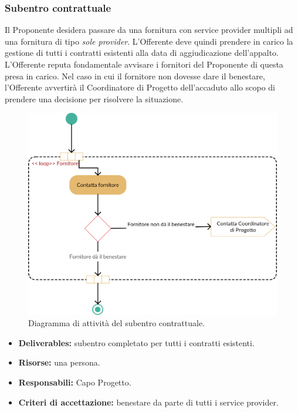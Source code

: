             \subsubsection{Subentro contrattuale}
            	Il Proponente desidera passare da una fornitura con service provider multipli ad una fornitura di tipo \textit{sole provider}. L'Offerente deve quindi prendere in carico la gestione di tutti i contratti esistenti alla data di aggiudicazione dell'appalto. L'Offerente reputa fondamentale avvisare i fornitori del Proponente di questa presa in carico. Nel caso in cui il fornitore non dovesse dare il benestare, l'Offerente avvertirà il Coordinatore di Progetto dell'accaduto allo scopo di prendere una decisione per risolvere la situazione.
                \begin{figure}[H]
                  	\centering
                  	\includegraphics[scale=0.25]{immagini/rollout/contatta-fornitore}
                	\caption{Diagramma di attività del subentro contrattuale.}
				\end{figure}
                
                 \begin{itemize}
               		\item  \textbf{Deliverables:} subentro completato per tutti i contratti esistenti.
                    \item  \textbf{Risorse:} una persona.
                    \item  \textbf{Responsabili:} Capo Progetto.
                    \item  \textbf{Criteri di accettazione:} benestare da parte di tutti i service provider.
                \end{itemize}
            

